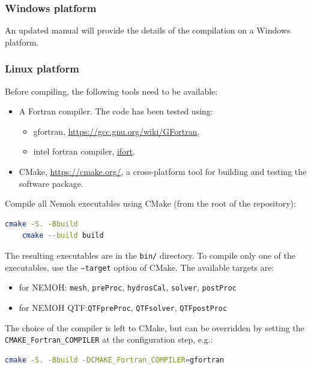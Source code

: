 \documentclass[12pt,a4paper,titlepage]{article}
\begin{document}
\subsubsection{Windows platform}
An updated manual will provide the details of the compilation on a Windows platform.

\subsubsection{Linux platform}
Before compiling, the following tools need to be available:
\begin{itemize}
    \item A Fortran compiler. The code has been tested using:
    \begin{itemize}
        \item gfortran, \url{https://gcc.gnu.org/wiki/GFortran}, 
        \item intel fortran compiler, \href{https://www.intel.com/content/www/us/en/developer/tools/oneapi/fortran-compiler.html#gs.jik1s6}{ifort}.
    \end{itemize}
    \item CMake, \url{https://cmake.org/}, a cross-platform tool for building and testing the software package.
\end{itemize}

\noindent
Compile all Nemoh executables using CMake (from the root of the repository):
\begin{lstlisting}[language=bash,keywordstyle=\color{blue},basicstyle=\ttfamily\footnotesize,backgroundcolor=\color{lightgray}]
    cmake -S. -Bbuild
    cmake --build build
\end{lstlisting}
The resulting executables are in the \texttt{bin/} directory. To compile only one of the executables, use the \texttt{--target} option of CMake. The available targets are:
\begin{itemize}
    \item for NEMOH: \texttt{{mesh}}, \texttt{{preProc}}, \texttt{{hydrosCal}}, \texttt{{solver}}, \texttt{{postProc}}
    \item for NEMOH QTF:\texttt{{QTFpreProc}}, \texttt{{QTFsolver}}, \texttt{{QTFpostProc}}
\end{itemize}

The choice of the compiler is left to CMake, but can be overridden by setting the \texttt{CMAKE\_Fortran\_COMPILER} at the configuration step, e.g.:
\begin{lstlisting}[language=bash,keywordstyle=\color{blue},basicstyle=\ttfamily\footnotesize,backgroundcolor=\color{lightgray}]
    cmake -S. -Bbuild -DCMAKE_Fortran_COMPILER=gfortran
\end{lstlisting}
\vspace*{5mm}
\end{document}

